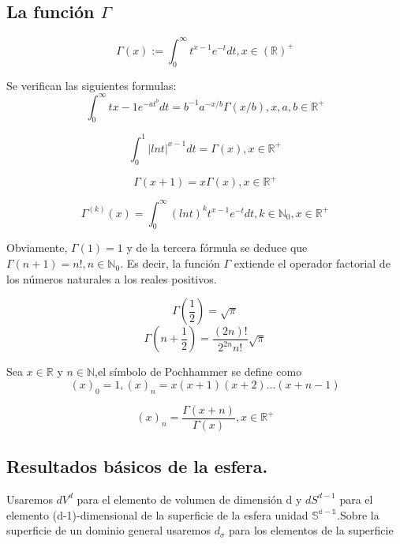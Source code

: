 \subsection{La función $\Gamma$}
\begin{defn}
	$$
	\Gamma(x) := \int_{0}^{\infty} t^{x-1}e^{-t}dt,		x\in\mathds{(R)^+}
	$$
\end{defn}
\begin{prop}Se verifican las siguientes formulas:
	$$
	\int_{0}^{\infty}  t{x-1}e^{-at^b}dt = b^{-1}a^{-x/b}\Gamma(x/b)  , x,a,b \in \mathds{R}^+
	$$
	
	$$
	\int_{0}^{1} |ln t|^{x-1}dt = \Gamma(x),   x \in \mathds{R}^+
	$$
	
	$$
	\Gamma(x+1) = x \Gamma(x) ,		x\in \mathds{R}^+
	$$
	
	$$
	\Gamma^{(k)}(x) = \int_{0}^{\infty} (ln t)^k t^{x-1} e^{-t} dt,   k\in\mathds{N}_0,x\in\mathds{R}^+
	$$
\end{prop}
\begin{rem}
Obviamente, $\Gamma(1)=1$ y de la tercera fórmula se deduce que $\Gamma(n+1)=n!, n\in\mathds{N}_0$. Es decir, la función $\Gamma$ extiende el operador factorial de los números naturales a los reales positivos.
\end{rem}
\begin{lem}
	$$
	\Gamma(\frac{1}{2}) = 	\sqrt{\pi}
	$$
	$$
	\Gamma(n+\frac{1}{2})=\frac{(2n)!}{2^{2n}n!} \sqrt{\pi}
	$$
\end{lem}
\begin{defn}Sea $x\in\mathds{R}$ y $n\in\mathds{N}$,el símbolo de Pochhammer se define como
	$$
	(x)_0 = 1, (x)_n=x(x+1)(x+2)...(x+n-1)
	$$
\end{defn}
\begin{prop}
	$$
	(x)_n = \frac{\Gamma(x+n)}{\Gamma(x)}, x\in\mathds{R}^+
	$$
\end{prop}
\subsection{Resultados básicos de la esfera.}
Usaremos $dV^d$ para el elemento de volumen de dimensión d y $dS^{d-1}$ para el elemento (d-1)-dimensional de la superficie de la esfera unidad $\mathds{S^{d-1}}$.Sobre la superficie de un dominio general usaremos $d_\sigma$ para los elementos de la superficie

